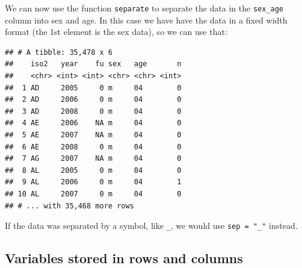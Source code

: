\documentclass[12pt,letterpaperpaper,openany]{book}
\newenvironment{Shaded}{\begin{snugshade}}{\end{snugshade}}
\newcommand{\DataTypeTok}[1]{\textcolor[rgb]{0.13,0.29,0.53}{#1}}
\newcommand{\DecValTok}[1]{\textcolor[rgb]{0.00,0.00,0.81}{#1}}
\newcommand{\KeywordTok}[1]{\textcolor[rgb]{0.13,0.29,0.53}{\textbf{#1}}}
\newcommand{\NormalTok}[1]{#1}
\newcommand{\OperatorTok}[1]{\textcolor[rgb]{0.81,0.36,0.00}{\textbf{#1}}}
\newcommand{\StringTok}[1]{\textcolor[rgb]{0.31,0.60,0.02}{#1}}
\begin{document}
We can now use the function \texttt{separate} to separate the data in the \texttt{sex\_age} column into sex and age. In this
case we have have the data in a fixed width format (the 1st element is the sex data), so we can use that:

\begin{Shaded}
\end{Shaded}

\begin{verbatim}
## # A tibble: 35,478 x 6
##    iso2   year    fu sex   age       n
##    <chr> <int> <int> <chr> <chr> <int>
##  1 AD     2005     0 m     04        0
##  2 AD     2006     0 m     04        0
##  3 AD     2008     0 m     04        0
##  4 AE     2006    NA m     04        0
##  5 AE     2007    NA m     04        0
##  6 AE     2008     0 m     04        0
##  7 AG     2007    NA m     04        0
##  8 AL     2005     0 m     04        0
##  9 AL     2006     0 m     04        1
## 10 AL     2007     0 m     04        0
## # ... with 35,468 more rows
\end{verbatim}

If the data was separated by a symbol, like \texttt{\_}, we would use \texttt{sep\ =\ "\_"} instead.

\hypertarget{variables-stored-in-rows-and-columns}{%
\subsection{Variables stored in rows and columns}\label{variables-stored-in-rows-and-columns}}

\begin{Shaded}
\end{Shaded}
\end{document}
